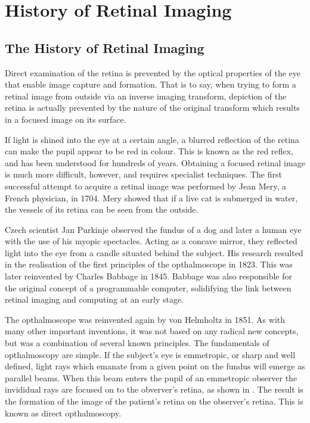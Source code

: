 
\chapter{History of Retinal Imaging}

\label{history_retinal_imaging}


\section{The History of Retinal Imaging}


Direct examination of the retina is prevented by the optical properties of the eye that enable image capture and formation.  That is to say, when trying to form a retinal image from outside via an inverse imaging transform, depiction of the retina is actually prevented by the nature of the original transform which results in a focused image on its surface.

If light is shined into the eye at a certain angle, a blurred reflection of the retina can make the pupil appear to be red in colour.  This is known as the red reflex, and has been understood for hundreds of years.  Obtaining a focused retinal image is much more difficult, however, and requires specialist techniques.  The first successful attempt to acquire a retinal image was performed by Jean Mery, a French physician, in 1704.  Mery  showed that if a live cat is submerged in water, the vessels of its retina can be seen from the outside.\cite{collegeoptometrists}

Czech scientist Jan Purkinje observed the fundus of a dog and later a human eye with the use of his myopic spectacles.  Acting as a concave mirror, they reflected light into the eye from a candle situated behind the subject.  His research resulted in the realisation of the first principles of the opthalmoscope in 1823.  This was later reinvented by Charles Babbage in 1845.\cite{flick1947centenary,keeler1997150}  Babbage was also responsible for the original concept of a programmable computer, solidifying the link between retinal imaging and computing at an early stage.\cite{halacy1970charles}

The opthalmoscope was reinvented again by von Helmholtz in 1851.  As with many other important inventions, it was not based on any radical new concepts, but was a combination of several known principles.  The fundamentals of opthalmoscopy are simple.  If the subject's eye is emmetropic, or sharp and well defined, light rays which emanate from a given point on the fundus will emerge as parallel beams.  When this beam enters the pupil of an emmetropic observer the invididual rays are focused on to the obverver's retina, as shown in .  The result is the formation of the image of the patient's retina on the observer's retina.  This is known as direct opthalmoscopy.

